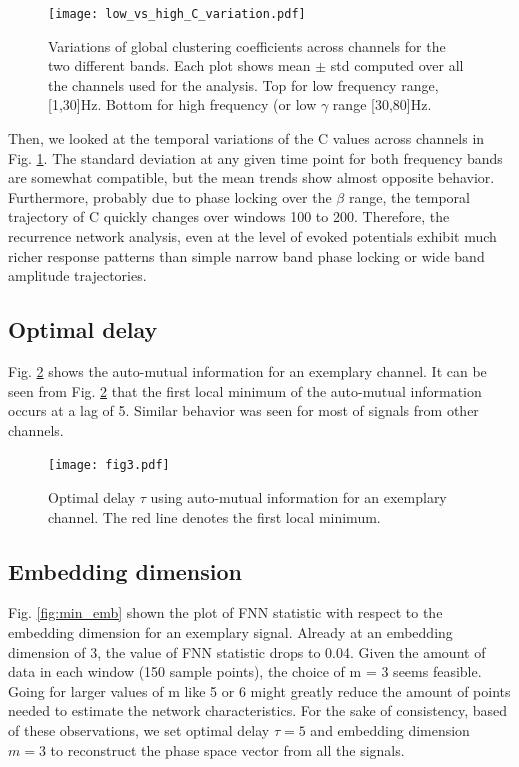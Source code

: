 \documentclass[letterpaper, 9pt, conference]{ieeeconf}
\begin{document}
 \begin{figure}[ht!]
                             \texttt{[image: low\_vs\_high\_C\_variation.pdf]}
                             \caption{\label{fig:GC_comp} Variations of global clustering coefficients across channels for the two different bands. Each plot shows mean $\pm$ std computed over all the channels used for the analysis. Top for low frequency range, [1,30]Hz. Bottom for high frequency (or low $\gamma$ range [30,80]Hz. }
\end{figure}
Then, we looked at the temporal variations of the C values across channels in Fig. \ref{fig:GC_comp}. The standard deviation at any given time point for both frequency bands are somewhat compatible, but the mean trends show almost opposite behavior. Furthermore, probably due to phase locking over the $\beta$ range, the temporal trajectory of C quickly changes over windows 100 to 200. Therefore, the recurrence network analysis, even at the level of evoked potentials exhibit much richer response patterns than simple narrow band phase locking or wide band amplitude trajectories. 

  \subsection{Optimal delay}
  
  Fig. \ref{fig:OptDelay} shows the auto-mutual information for an exemplary channel. It can be seen from Fig. \ref{fig:OptDelay}  that the first local minimum of the auto-mutual information occurs at a lag of 5. Similar behavior was seen for most of signals from other channels. 
\begin{figure}[ht!]
                             \texttt{[image: fig3.pdf]}
                             \caption{\label{fig:OptDelay} Optimal delay $\tau$ using auto-mutual information for an exemplary channel. The red line denotes the first local minimum.}
\end{figure}
 
 \subsection{Embedding dimension}

Fig. \ref{fig:min_emb}  shown the plot of FNN statistic with respect to the embedding dimension for an exemplary signal. Already at an embedding dimension of 3, the value of FNN statistic drops to 0.04. Given the amount of data in each window (150 sample points), the choice of m = 3 seems feasible. Going for larger values of m like 5 or 6 might greatly reduce the amount of points needed to estimate the network characteristics. For the sake of consistency, based of these observations, we set optimal delay $\tau = 5$ and embedding dimension $m = 3$  to reconstruct the phase space vector from all the signals.
\end{document}
